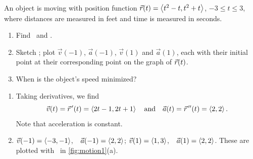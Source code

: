 \begin{example}\label{ex_motion1}%
An object is moving with position function $\vec r(t) =\left\langle t^2-t,t^2+t\right\rangle$, $-3\leq t\leq 3$, where distances are measured in feet and time is measured in seconds.
\begin{enumerate}
	\item Find \vvt\  and \vat.
	\item	Sketch \vrt; plot $\vec v(-1)$, $\vec a(-1)$, $\vec v(1)$ and $\vec a(1)$, each with their initial point at their corresponding point on the graph of $\vec r(t)$.
	\item	When is the object's speed minimized?
\end{enumerate}
\solution
\begin{enumerate}
	\item Taking derivatives, we find
	\[\vec v(t) = \vec r\hskip1.25pt '(t) =\left\langle 2t-1,2t+1\right\rangle\quad \text{and} \quad \vec a(t) = \vec r\hskip1.25pt ''(t) =\left\langle 2,2\right\rangle.\]
	Note that acceleration is constant.

	\item		$\vec v(-1) =\left\langle -3,-1\right\rangle$,\ \ $\vec a(-1) =\left\langle 2,2\right\rangle$; \quad $\vec v(1) =\left\langle 1,3\right\rangle$,\ \ $\vec a(1) =\left\langle 2,2\right\rangle$. These are plotted with \vrt\ in \autoref{fig:motion1}(a).
	

\end{enumerate}
\end{example}

